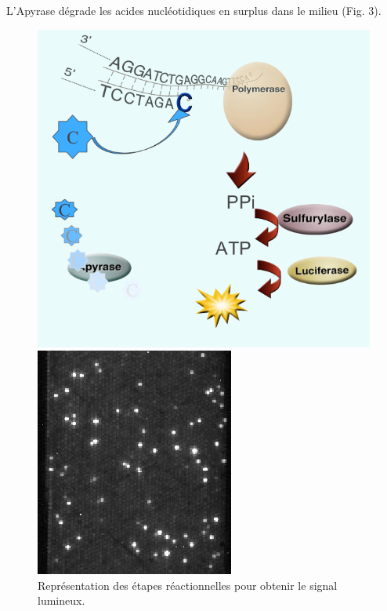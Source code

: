 L'Apyrase dégrade les acides nucléotidiques en surplus dans le milieu (Fig. 3).
\begin{figure}[!h]
   \begin{minipage}[b]{0.40\linewidth}
      \centering \includegraphics[scale=0.3]{Images/proces.png}
   \end{minipage}\hfill
   \begin{minipage}[b]{0.48\linewidth}   
      \centering \includegraphics[scale=0.4]{Images/454.png}
   \end{minipage}
   \caption{Représentation des étapes réactionnelles pour obtenir le signal lumineux.}
\end{figure}
~~\\
